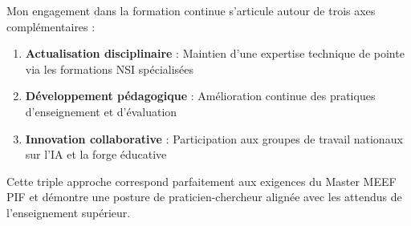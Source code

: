 Mon engagement dans la formation continue s'articule autour de trois axes complémentaires :

\begin{enumerate}[leftmargin=*]
    \item \textbf{Actualisation disciplinaire} : Maintien d'une expertise technique de pointe via les formations NSI spécialisées
    \item \textbf{Développement pédagogique} : Amélioration continue des pratiques d'enseignement et d'évaluation
    \item \textbf{Innovation collaborative} : Participation aux groupes de travail nationaux sur l'IA et la forge éducative
\end{enumerate}

Cette triple approche correspond parfaitement aux exigences du Master MEEF PIF et démontre une posture de praticien-chercheur \parencite{schon_reflective_practitioner} alignée avec les attendus de l'enseignement supérieur.